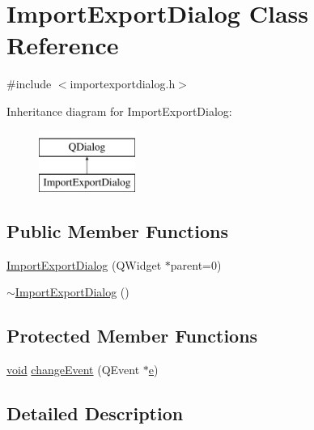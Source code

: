 \hypertarget{class_import_export_dialog}{\section{Import\-Export\-Dialog Class Reference}
\label{class_import_export_dialog}
}


{\ttfamily \#include $<$importexportdialog.\-h$>$}

Inheritance diagram for Import\-Export\-Dialog\-:\begin{figure}[H]
\begin{center}
\leavevmode
\includegraphics[height=2.000000cm]{class_import_export_dialog}
\end{center}
\end{figure}
\subsection*{Public Member Functions}
\begin{DoxyCompactItemize}
\item 
\hyperlink{class_import_export_dialog_a17dc61f63ec24be1769d63152c116f16}{Import\-Export\-Dialog} (Q\-Widget $\ast$parent=0)
\item 
\hyperlink{class_import_export_dialog_a6cfd90d46c386291e6a6f2d952aa3682}{$\sim$\-Import\-Export\-Dialog} ()
\end{DoxyCompactItemize}
\subsection*{Protected Member Functions}
\begin{DoxyCompactItemize}
\item 
\hyperlink{group___u_a_v_objects_plugin_ga444cf2ff3f0ecbe028adce838d373f5c}{void} \hyperlink{class_import_export_dialog_ada03b1366da59449ce7d8b2e38f7a4b5}{change\-Event} (Q\-Event $\ast$\hyperlink{_o_p_plots_8m_a9425be9aab51621e317ba7ade564b570}{e})
\end{DoxyCompactItemize}


\subsection{Detailed Description}


